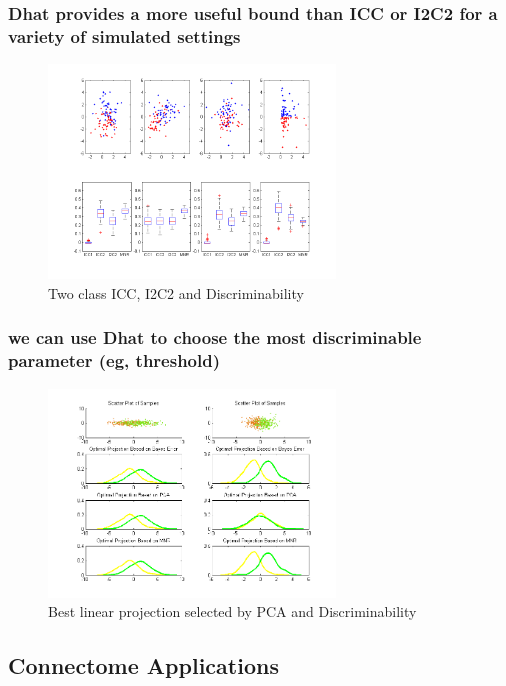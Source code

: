 \documentclass{article}
\begin{document}
\subsubsection{Dhat provides a more useful bound than ICC or I2C2 for a variety of simulated settings}

\begin{figure}[t!]
\includegraphics[width=3.0in]{../Figs/Figure1_draft.png}
\caption{Two class ICC, I2C2 and Discriminability}
\label{fig:2}
\end{figure}



\subsubsection{we can use Dhat to choose the most discriminable parameter (eg, threshold)}


\begin{figure}[t!]
\includegraphics[width=3.0in]{../Figs/parameter_selection_2sub.png}
\caption{Best linear projection selected by PCA and Discriminability}
\label{fig:3}
\end{figure}




\subsection{Connectome Applications}
\end{document}
